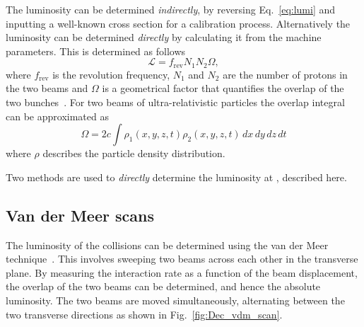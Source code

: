 The luminosity can be determined \emph{indirectly}, by reversing Eq.~\ref{eq:lumi} and inputting a well-known cross section for a calibration process. Alternatively the luminosity can be determined \emph{directly} by calculating it from the machine parameters. 
This is determined as follows 
\begin{equation}
\mathcal{L} = f_{\text{rev}}N_{1}N_{2}\Omega,
\end{equation}
where $f_{\text{rev}}$ is the revolution frequency, $N_{1}$ and $N_{2}$ are the number of protons in the two beams and $\Omega$ is a geometrical factor that quantifies the overlap of the two bunches~\cite{1748-0221-9-12-P12005}. 
For two beams of ultra-relativistic particles the overlap integral can be approximated as 
\begin{equation}
\Omega = 2c\int \rho_{1}(x,y,z,t)\rho_{2}(x,y,z,t)\,dx\,dy\,dz\,dt 
\end{equation}
where $\rho$ describes the particle density distribution.

Two methods are used to \emph{directly} determine the luminosity at \lhcb, described here.



\subsection{Van der Meer scans}

The luminosity of the collisions can be determined using the van der Meer technique~\cite{VanDerMeer}. This involves sweeping two beams across each other in the transverse plane. By measuring the interaction rate as a function of the beam displacement, the overlap of the two beams can be determined, and hence the absolute luminosity. The two beams are moved simultaneously, alternating between the two transverse directions as shown in Fig.~\ref{fig:Dec_vdm_scan}.

